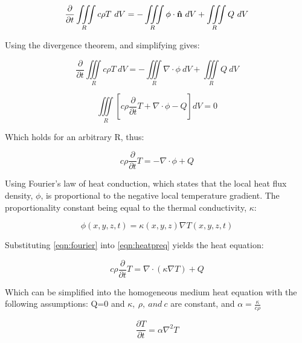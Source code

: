 \begin{appendices}
\begin{equation}
\frac{\partial}{\partial t} \iiint\limits_{R} c\rho T\ dV = -\iiint \limits_{R} \phi\cdot \bold{\hat{n}}\ dV +  \iiint\limits_{R} Q\ dV
\end{equation}

Using the divergence theorem, and simplifying gives: 


\begin{equation}
\frac{\partial}{\partial t} \iiint\limits_{R} c\rho T\ dV = -\iiint \limits_{R} \nabla\cdot \phi\ dV +  \iiint\limits_{R} Q\ dV
\end{equation}

\begin{equation}
\iiint\limits_{R} \left[ c\rho \frac{\partial}{\partial t} T + \nabla\cdot \phi - Q\right] dV = 0
\end{equation}

Which holds for an arbitrary R, thus:

\begin{equation}
c\rho\frac{\partial}{\partial t}T = - \nabla \cdot \phi + Q
\label{eqn:heatpreq}
\end{equation}



Using Fourier's law of heat conduction, which states that the local heat flux density, $\phi$, is proportional to the negative local temperature gradient. The proportionality constant being equal to the thermal conductivity, $\kappa$:

\begin{equation}
\phi(x,y,z,t)=\kappa(x,y,z)\nabla T(x,y,z,t)
\label{eqn:fourier}
\end{equation}

Substituting \cref{eqn:fourier} into \cref{eqn:heatpreq} yields the heat equation:

\begin{equation}
c\rho\frac{\partial}{\partial t}T = \nabla\cdot (\kappa\nabla T) + Q
\end{equation}

Which can be simplified into the homogeneous medium heat equation with the following assumptions: Q=0 and $\kappa,\ \rho,\ and\ c$ are constant, and $\alpha=\tfrac{\kappa}{c\rho}$

\begin{equation}
\frac{\partial T}{\partial t} = \alpha \nabla^2 T
\end{equation}
\end{appendices}

